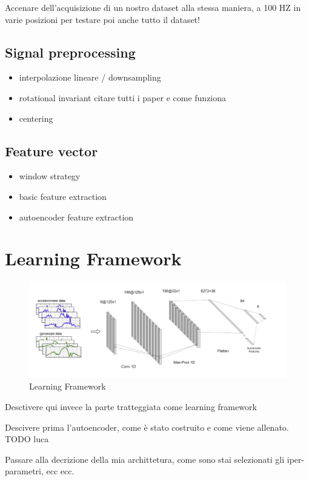 Accenare dell'acquisizione di un nostro dataset alla stessa maniera, a 100 HZ in varie posizioni per testare poi anche tutto il dataset!

\subsection{Signal preprocessing}

\begin{itemize}
	\item interpolazione lineare / downsampling
	\item rotational invariant citare tutti i paper e come funziona
	\item centering
\end{itemize}

\subsection{Feature vector}
\begin{itemize}
	\item window strategy
	\item basic feature extraction
	\item autoencoder feature extraction
\end{itemize}

\section{Learning Framework}
\label{sec:learning_framework}

\begin{figure}[h]
	\centering
	\includegraphics[width=1\textwidth]{images/full_architecture.jpg}
	\caption{Learning Framework}
\end{figure}

Desctivere qui invece la parte tratteggiata come learning framework

Descivere prima l'autoencoder, come è stato costruito e come viene allenato. TODO luca

Passare alla decrizione della mia archittetura, come sono stai selezionati gli iper-parametri, ecc ecc.

